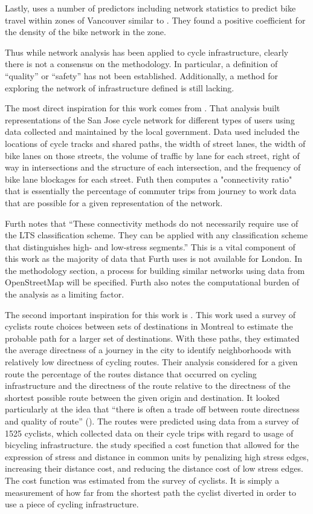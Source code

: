 Lastly, \cite{osama2017models} uses a number of predictors including network statistics to predict bike travel within zones of Vancouver similar to \cite{schoner2014missing}. They found a positive coefficient for the density of the bike network in the zone. 

Thus while network analysis has been applied to cycle infrastructure, clearly there is not a consensus on the methodology. In particular, a definition of ``quality'' or ``safety'' has not been established. Additionally, a method for exploring the network of infrastructure defined is still lacking. 

The most direct inspiration for this work comes from \cite{furth2016network}. That analysis built representations of the San Jose cycle network for different types of users using data collected and maintained by the local government. Data used included the locations of cycle tracks and shared paths, the width of street lanes, the width of bike lanes on those streets,  the volume of traffic by lane for each street, right of way in intersections and the structure of each intersection, and the frequency of bike lane blockages for each street. Futh then computes a "connectivity ratio" that is essentially the percentage of commuter trips from journey to work data that are possible for a given representation of the network. 

Furth notes that ``These connectivity methods do not necessarily require use of the LTS classification scheme. They can be applied with any classification scheme that distinguishes high- and low-stress segments.'' This is a vital component of this work as the majority of data that Furth uses is not available for London. In the methodology section, a process for building similar networks using data from OpenStreetMap will be specified. Furth also notes the computational burden of the analysis as a limiting factor. 

The second important inspiration for this work is \cite{boisjoly2019bicycle}. This work used a survey of cyclists route choices between sets of destinations in Montreal to estimate the probable path for a larger set of destinations. With these paths, they estimated the average directness of a journey in the city to identify neighborhoods with relatively low directness of cycling routes.  Their analysis considered for a given route the percentage of the routes distance that occurred on cycling infrastructure and the directness of the route relative to the directness of the shortest possible route between the given origin and destination. It looked particularly at the idea that ``there is often a trade off between route directness and quality of route'' (\cite{boisjoly2019bicycle}).  The routes were predicted using data from a survey of 1525 cyclists, which collected data on their cycle trips with regard to usage of bicycling infrastructure. the study specified a cost function that allowed for the expression of stress and distance in common units by penalizing high stress edges, increasing their distance cost, and reducing the distance cost of low stress edges. The cost function was estimated from the survey of cyclists. It is simply a measurement of how far from the shortest path the cyclist diverted in order to use a piece of cycling infrastructure. 

